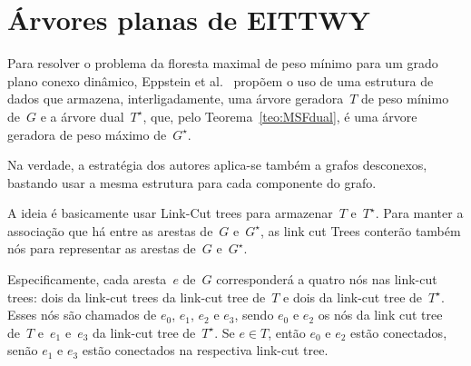 \begin{comment}
\section{Link-Cut Trees}
\label{sec:linkcuttree}

Para uma introdução sobre link-cut trees, recomendamos o trabalho de~\cite{linkcuttree}.

\begin{itemize}
\item \linkcutCreate(): Cria e retorna um novo nó de link-cut tree.
\item \linkcutAddEdge($v$, $w$): Adiciona uma aresta de~$v$ a~$w$, tornando~$v$ um filho de~$w$. Essa operação assume que~$v$ é a raiz de uma árvore~$T$ e que $w$ não é um nó de~$T$.
\item \linkcutDelEdge($v$): Remove a aresta de~$v$ para seu pai.
\item \linkcutEvert($v$): Torna~$v$ a raiz de sua árvore revertendo o caminho de~$v$ para a raiz original.
\item \linkcutMax($v$): Retorna o nó de peso máximo no caminho entre~$v$ e a raiz de sua árvore.
\item \linkcutMin($v$): Retorna o nó de peso mínimo no caminho entre~$v$ e a raiz de sua árvore.
\end{itemize}
\end{comment}

\section{Árvores planas de EITTWY}
Para resolver o problema da floresta maximal de peso mínimo para um grado plano conexo dinâmico, Eppstein et al.~\cite{EPPSTEIN-planar} propõem o uso de uma estrutura de dados que armazena, interligadamente, uma árvore geradora~$T$ de peso mínimo de~$G$ e a árvore dual~$T^\star$, que, pelo Teorema~\ref{teo:MSFdual}, é uma árvore geradora de peso máximo de~$G^\star$.

Na verdade, a estratégia dos autores aplica-se também a grafos desconexos, bastando usar a mesma estrutura para cada componente do grafo.

A ideia é basicamente usar Link-Cut trees para armazenar~$T$ e~$T^\star$.
Para manter a associação que há entre as arestas de~$G$ e~$G^\star$, as link cut Trees conterão também nós para representar as arestas de~$G$ e~$G^\star$.

Especificamente, cada aresta~$e$ de~$G$ corresponderá a quatro nós nas link-cut trees: dois da link-cut trees da link-cut tree de~$T$ e dois da link-cut tree de~$T^\star$.
Esses nós são chamados de $e_0$, $e_1$, $e_2$ e $e_3$, sendo $e_0$ e $e_2$ os nós da link cut tree de~$T$ e~$e_1$ e~$e_3$ da link-cut tree de~$T^\star$.
Se $e\in T$, então $e_0$ e $e_2$ estão conectados, senão $e_1$ e $e_3$ estão conectados na respectiva link-cut tree.

